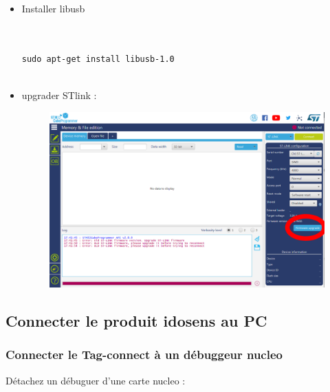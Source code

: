 \documentclass{article}
\begin{document}
\begin{itemize}
    



\item Installer libusb

\begin{verbatim}


sudo apt-get install libusb-1.0


\end{verbatim}

\item  upgrader STlink :

\begin{figure}[H]
\begin{center}
\advance\leftskip-3cm
\advance\rightskip-3cm
\includegraphics[keepaspectratio=true,scale=0.3]{stlink_upgrade.png}
\label{visina8}
\end{center}\end{figure}



\end{itemize}


\subsection{Connecter le produit idosens au PC}

\subsubsection{Connecter le Tag-connect à un débuggeur nucleo}
Détachez un débuguer d'une carte nucleo :
\end{document}
